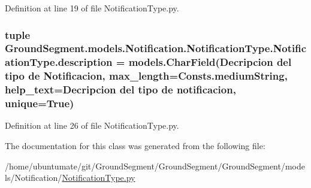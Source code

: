 Definition at line 19 of file Notification\+Type.\+py.

\hypertarget{class_ground_segment_1_1models_1_1_notification_1_1_notification_type_1_1_notification_type_afc589eb485bea2c3fe042c2e38ca7e66}{}
\subsubsection[{description}]{\setlength{\rightskip}{0pt plus 5cm}tuple Ground\+Segment.\+models.\+Notification.\+Notification\+Type.\+Notification\+Type.\+description = models.\+Char\+Field(\textquotesingle{}Decripcion del tipo de Notificacion\textquotesingle{}, max\+\_\+length={\bf Consts.\+medium\+String}, help\+\_\+text=\textquotesingle{}Decripcion del tipo de notificacion\textquotesingle{}, unique=True)\hspace{0.3cm}{\ttfamily [static]}}\label{class_ground_segment_1_1models_1_1_notification_1_1_notification_type_1_1_notification_type_afc589eb485bea2c3fe042c2e38ca7e66}


Definition at line 26 of file Notification\+Type.\+py.



The documentation for this class was generated from the following file\+:\begin{DoxyCompactItemize}
\item 
/home/ubuntumate/git/\+Ground\+Segment/\+Ground\+Segment/\+Ground\+Segment/models/\+Notification/\hyperlink{_notification_type_8py}{Notification\+Type.\+py}\end{DoxyCompactItemize}
